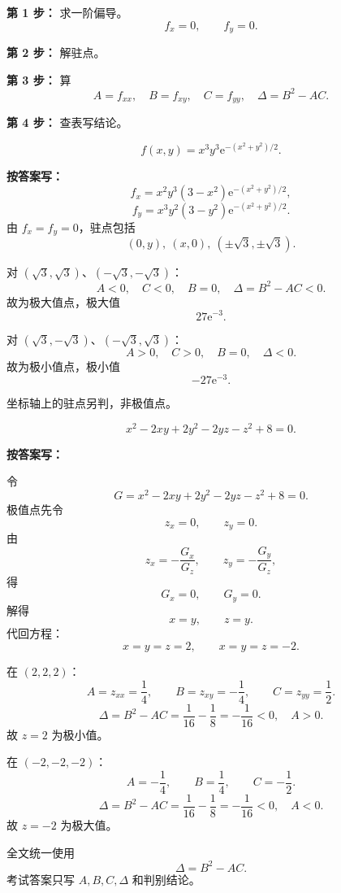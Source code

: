 \documentclass[11pt,a4paper,UTF8]{ctexart}
\newcommand{\ee}{\mathrm e}
\begin{document}
\begin{templatebox}[考试步骤]
\textbf{第 1 步：} 求一阶偏导。
\[
f_x=0,\qquad f_y=0.
\]

\textbf{第 2 步：} 解驻点。

\textbf{第 3 步：} 算
\[
A=f_{xx},\quad B=f_{xy},\quad C=f_{yy},\quad \Delta=B^2-AC.
\]

\textbf{第 4 步：} 查表写结论。
\end{templatebox}

\begin{answerbox}[例 1：普通二元极值，2023--2024]
\[
f(x,y)=x^3y^3\ee^{-(x^2+y^2)/2}.
\]

\textbf{按答案写：}
\[
f_x=x^2y^3(3-x^2)\ee^{-(x^2+y^2)/2},
\]
\[
f_y=x^3y^2(3-y^2)\ee^{-(x^2+y^2)/2}.
\]
由 \(f_x=f_y=0\)，驻点包括
\[
(0,y),\ (x,0),\ (\pm\sqrt3,\pm\sqrt3).
\]

对 \((\sqrt3,\sqrt3)\)、\((-\sqrt3,-\sqrt3)\)：
\[
A<0,\quad C<0,\quad B=0,\quad \Delta=B^2-AC<0.
\]
故为极大值点，极大值
\[
\boxed{27\ee^{-3}}.
\]

对 \((\sqrt3,-\sqrt3)\)、\((-\sqrt3,\sqrt3)\)：
\[
A>0,\quad C>0,\quad B=0,\quad \Delta<0.
\]
故为极小值点，极小值
\[
\boxed{-27\ee^{-3}}.
\]

坐标轴上的驻点另判，非极值点。
\end{answerbox}

\begin{answerbox}[例 2：隐函数极值，2022--2023]
\[
x^2-2xy+2y^2-2yz-z^2+8=0.
\]

\textbf{按答案写：}

令
\[
G=x^2-2xy+2y^2-2yz-z^2+8=0.
\]
极值点先令
\[
z_x=0,\qquad z_y=0.
\]
由
\[
z_x=-\frac{G_x}{G_z},\qquad z_y=-\frac{G_y}{G_z},
\]
得
\[
G_x=0,\qquad G_y=0.
\]
解得
\[
x=y,\qquad z=y.
\]
代回方程：
\[
x=y=z=2,\qquad x=y=z=-2.
\]

在 \((2,2,2)\)：
\[
A=z_{xx}=\frac14,\qquad B=z_{xy}=-\frac14,\qquad C=z_{yy}=\frac12.
\]
\[
\Delta=B^2-AC=\frac1{16}-\frac18=-\frac1{16}<0,\quad A>0.
\]
故 \(z=2\) 为极小值。

在 \((-2,-2,-2)\)：
\[
A=-\frac14,\qquad B=\frac14,\qquad C=-\frac12.
\]
\[
\Delta=B^2-AC=\frac1{16}-\frac18=-\frac1{16}<0,\quad A<0.
\]
故 \(z=-2\) 为极大值。
\end{answerbox}

\begin{scorebox}[得分点]
全文统一使用
\[
\Delta=B^2-AC.
\]
考试答案只写 \(A,B,C,\Delta\) 和判别结论。
\end{scorebox}

\newpage
\end{document}
